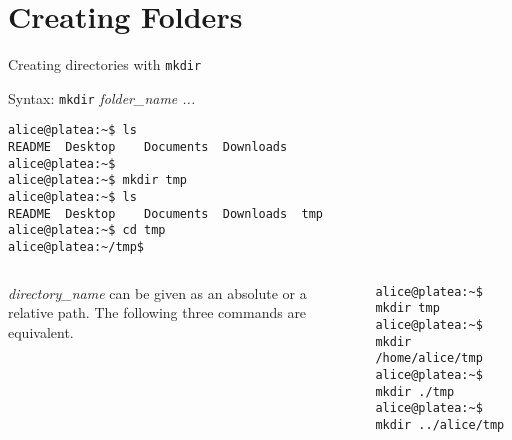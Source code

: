\section{Creating Folders}
\begin{frame}[fragile]{Creating directories with \alert{\texttt{mkdir}}}
  
  \begin{block}{ Syntax: \alert{\texttt{mkdir}} \emph{folder\_name ...} }
    
  {\scriptsize
      \begin{lstlisting}
alice@platea:~$ ls
README  Desktop    Documents  Downloads  
alice@platea:~$
alice@platea:~$ mkdir tmp
alice@platea:~$ ls
README  Desktop    Documents  Downloads  tmp
alice@platea:~$ cd tmp
alice@platea:~/tmp$ 
      \end{lstlisting}
  }
    
    \begin{columns}[t]
      {\footnotesize \emph{directory\_name} can be
        given as an \alert{absolute} or a \alert{relative} path. The following three commands are
        equivalent.}
        \hspace{-3cm}
      {\scriptsize
        \begin{lstlisting}
alice@platea:~$ mkdir tmp
alice@platea:~$ mkdir /home/alice/tmp
alice@platea:~$ mkdir ./tmp
alice@platea:~$ mkdir ../alice/tmp
        \end{lstlisting}
      }
    \end{columns}

  \end{block}
  
  
\end{frame}
